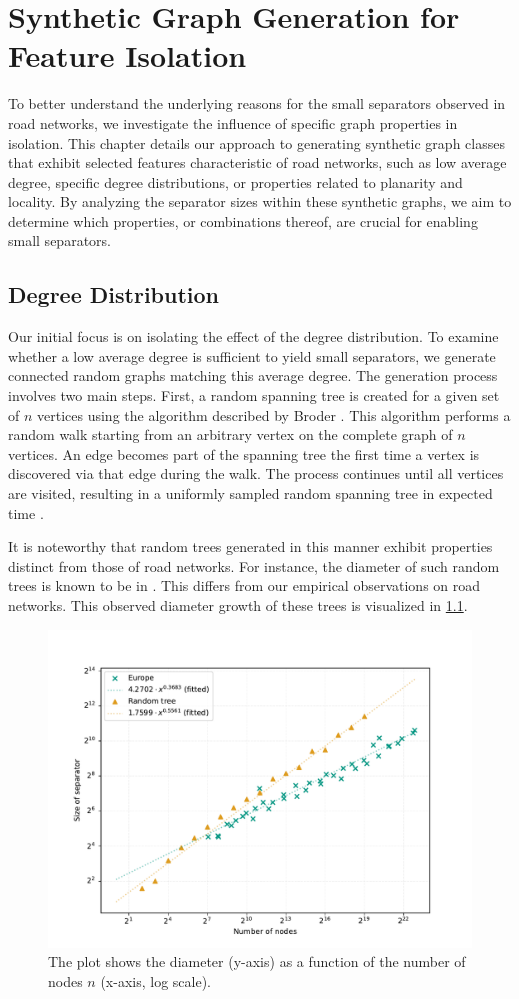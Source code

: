 \chapter{Synthetic Graph Generation for Feature Isolation}
\label{ch:synthetic_generation}

To better understand the underlying reasons for the small separators observed in road networks, we investigate the influence of specific graph properties in isolation.
This chapter details our approach to generating synthetic graph classes that exhibit selected features characteristic of road networks, such as low average degree, specific degree distributions, or properties related to planarity and locality.
By analyzing the separator sizes within these synthetic graphs, we aim to determine which properties, or combinations thereof, are crucial for enabling small separators.

\section{Degree Distribution}

Our initial focus is on isolating the effect of the degree distribution.
To examine whether a low average degree is sufficient to yield small separators, we generate connected random graphs matching this average degree.
The generation process involves two main steps.
First, a random spanning tree is created for a given set of \(n\) vertices using the algorithm described by Broder \cite{broder_generating_1989}.
This algorithm performs a random walk starting from an arbitrary vertex on the complete graph of \(n\) vertices.
An edge becomes part of the spanning tree the first time a vertex is discovered via that edge during the walk.
The process continues until all vertices are visited, resulting in a uniformly sampled random spanning tree in expected time .

It is noteworthy that random trees generated in this manner exhibit properties distinct from those of road networks.
For instance, the diameter of such random trees is known to be in  \cite{chlamtac_tree-based_1987}.
This differs from our empirical observations on road networks.
This observed diameter growth of these trees is visualized in \cref{fig:diameter_karlsruhe}.

\begin{figure}[tbhp]
	\centering
	\includegraphics[width=0.6\linewidth]{graphics/diameters.pdf}
	\caption{The plot shows the diameter (y-axis) as a function of the number of nodes \(n\) (x-axis, log scale).}
	\label{fig:diameter_karlsruhe}
\end{figure}

